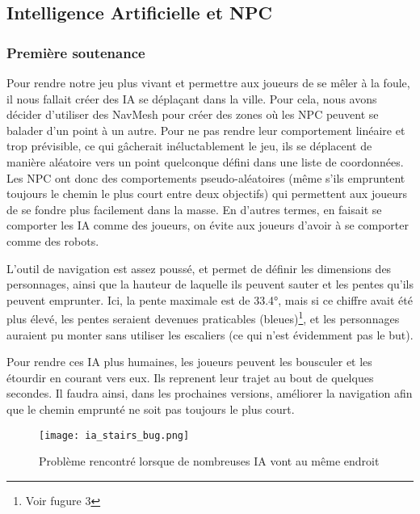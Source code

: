 \subsection{Intelligence Artificielle et NPC}

    \subsubsection{Première soutenance}

        Pour rendre notre jeu plus vivant et permettre aux joueurs de se mêler à la foule,
        il nous fallait créer des IA se déplaçant dans la ville.
        Pour cela, nous avons décider d'utiliser des NavMesh pour créer des zones où les 
        NPC peuvent se balader d'un point à un autre.
        Pour ne pas rendre leur comportement linéaire et trop prévisible, ce qui gâcherait inéluctablement le jeu,
        ils se déplacent de manière aléatoire  vers un point quelconque défini dans une liste de coordonnées.
        Les NPC ont donc des comportements pseudo-aléatoires (même s'ils empruntent toujours le chemin le plus court entre deux objectifs) qui permettent
        aux joueurs de se fondre plus facilement dans la masse. En d'autres termes, en faisait se comporter les IA comme des joueurs, on évite aux joueurs
        d'avoir à se comporter comme des robots.

        L’outil de navigation est assez poussé, et permet de définir les dimensions des personnages,
        ainsi que la hauteur de laquelle ils peuvent sauter et les pentes qu’ils peuvent emprunter.
        Ici, la pente maximale est de 33.4°, mais si ce chiffre avait été plus élevé,
        les pentes seraient devenues praticables (bleues)\footnote{Voir fugure 3}, et les personnages auraient pu
        monter sans utiliser les escaliers (ce qui n’est évidemment pas le but).


        Pour rendre ces IA plus humaines, les joueurs peuvent les bousculer et les étourdir en courant vers eux.
        Ils reprenent leur trajet au bout de quelques secondes. Il faudra ainsi, dans les prochaines versions, 
        améliorer la navigation afin que le chemin emprunté ne soit pas toujours le plus court. 
        

        \begin{figure}[!hbt]
                \centering
                \texttt{[image: ia\_stairs\_bug.png]}
                \caption{Problème rencontré lorsque de nombreuses IA vont au même endroit}
        \end{figure}


